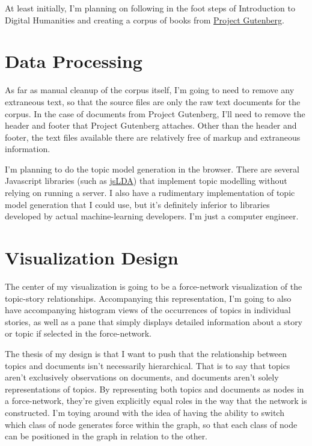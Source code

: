 At least initially, I'm planning on following in the foot steps of
Introduction to Digital Humanities and creating a corpus of books from
\href{https://www.gutenberg.org/}{Project Gutenberg}.

\section{Data Processing}
As far as manual cleanup of the corpus itself, I'm going to need to
remove any extraneous text, so that the source files are only the raw
text documents for the corpus.  In the case of documents from Project
Gutenberg, I'll need to remove the header and footer that Project
Gutenberg attaches. Other than the header and footer, the text files
available there are relatively free of markup and extraneous
information.

I'm planning to do the topic model generation in the browser.  There are
several Javascript libraries (such as
\href{https://mimno.infosci.cornell.edu/jsLDA/}{jsLDA}) that implement
topic modelling without relying on running a server.  I also have a
rudimentary implementation of topic model generation that I could use,
but it's definitely inferior to libraries developed by actual
machine-learning developers.  I'm just a computer engineer.

\section{Visualization Design}

The center of my visualization is going to be a force-network
visualization of the topic-story relationships.  Accompanying this
representation, I'm going to also have accompanying histogram views of
the occurrences of topics in individual stories, as well as a pane that
simply displays detailed information about a story or topic if selected
in the force-network.

The thesis of my design is that I want to push that the relationship
between topics and documents isn't necessarily hierarchical.  That is to
say that topics aren't exclusively observations on documents, and
documents aren't solely representations of topics.  By representing both
topics and documents as nodes in a force-network, they're given
explicitly equal roles in the way that the network is constructed.  I'm
toying around with the idea of having the ability to switch which class
of node generates force within the graph, so that each class of node can
be positioned in the graph in relation to the other.

